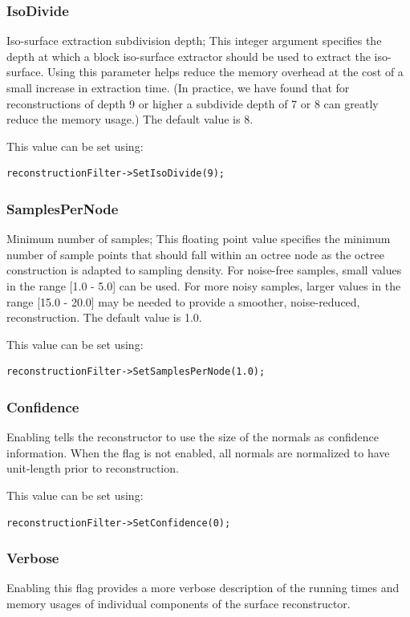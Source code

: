 \documentclass{InsightArticle}
\begin{document}
\subsubsection{IsoDivide}
Iso-surface extraction subdivision depth; This integer argument specifies the depth at which a block iso-surface extractor should be used to extract the iso-surface. Using this parameter helps reduce the memory overhead at the cost of a small increase in extraction time. (In practice, we have found that for reconstructions of depth 9 or higher a subdivide depth of 7 or 8 can greatly reduce the memory usage.) The default value is 8.

This value can be set using:
\begin{verbatim}
reconstructionFilter->SetIsoDivide(9); 
\end{verbatim}

\subsubsection{SamplesPerNode}
Minimum number of samples; This floating point value specifies the minimum number of sample points that should fall within an octree node as the octree construction is adapted to sampling density. For noise-free samples, small values in the range [1.0 - 5.0] can be used. For more noisy samples, larger values in the range [15.0 - 20.0] may be needed to provide a smoother, noise-reduced, reconstruction. The default value is 1.0.

This value can be set using:
\begin{verbatim}
reconstructionFilter->SetSamplesPerNode(1.0); 
\end{verbatim}

\subsubsection{Confidence}
Enabling tells the reconstructor to use the size of the normals as confidence information. When the flag is not enabled, all normals are normalized to have unit-length prior to reconstruction.

This value can be set using:
\begin{verbatim}
reconstructionFilter->SetConfidence(0); 
\end{verbatim}

\subsubsection{Verbose}
Enabling this flag provides a more verbose description of the running times and memory usages of individual components of the surface reconstructor.
\end{document}
